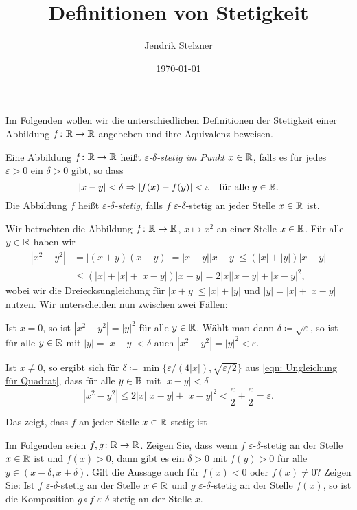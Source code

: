 \documentclass[a4paper,10pt]{article}
\title{Definitionen von Stetigkeit}
\author{Jendrik Stelzner}
\date{\today}
\begin{document}
\maketitle


Im Folgenden wollen wir die unterschiedlichen Definitionen der Stetigkeit einer Abbildung $f \colon \mathbb{R} \to \mathbb{R}$ angebeben und ihre Äquivalenz beweisen.


\begin{defi}
 Eine Abbildung $f \colon \mathbb{R} \to \mathbb{R}$ heißt \emph{$\varepsilon$-$\delta$-stetig im Punkt $x \in \mathbb{R}$}, falls es für jedes $\varepsilon > 0$ ein $\delta > 0$ gibt, so dass
 \[
  |x-y| < \delta \Rightarrow |f(x)-f(y)| < \varepsilon \quad \text{für alle $y \in \mathbb{R}$}.
 \]
 Die Abbildung $f$ heißt \emph{$\varepsilon$-$\delta$-stetig}, falls $f$ $\varepsilon$-$\delta$-stetig an jeder Stelle $x \in \mathbb{R}$ ist.
\end{defi}

\begin{bsp}
 Wir betrachten die Abbildung $f \colon \mathbb{R} \to \mathbb{R}$, $x \mapsto x^2$ an einer Stelle $x \in \mathbb{R}$. Für alle $y \in \mathbb{R}$ haben wir
 \begin{equation}\label{eqn: Ungleichung für Quadrat}
  \begin{aligned}
   \left| x^2 - y^2 \right|
   &= |(x+y)(x-y)|
   = |x+y||x-y|
   \leq (|x|+|y|)|x-y| \\
   &\leq (|x|+|x|+|x-y|)|x-y|
   = 2|x||x-y| + |x-y|^2,
  \end{aligned}
 \end{equation}
 wobei wir die Dreiecksungleichung für \mbox{$|x+y| \leq |x| + |y|$} und \mbox{$|y| = |x| + |x-y|$} nutzen. Wir unterscheiden nun zwischen zwei Fällen:
 
 Ist $x = 0$, so ist $|x^2 - y^2| = |y|^2$ für alle $y \in \mathbb{R}$. Wählt man dann $\delta \coloneqq \sqrt{\varepsilon}$, so ist für alle $y \in \mathbb{R}$ mit $|y| = |x-y| < \delta$ auch $|x^2-y^2| = |y|^2 < \varepsilon$.
 
 Ist $x \neq 0$, so ergibt sich für $\delta \coloneqq \min\{ \varepsilon/(4|x|), \sqrt{\varepsilon/2} \}$ aus \eqref{eqn: Ungleichung für Quadrat}, dass für alle $y \in \mathbb{R}$ mit $|x-y| < \delta$
 \[
  \left| x^2 - y^2 \right| \leq 2|x||x-y| + |x-y|^2 < \frac{\varepsilon}{2} + \frac{\varepsilon}{2} = \varepsilon.
 \]
 
 Das zeigt, dass $f$ an jeder Stelle $x \in \mathbb{R}$ stetig ist
\end{bsp}


\begin{ExerciseList}
 Im Folgenden seien $f, g \colon \mathbb{R} \to \mathbb{R}$.
 \Exercise
  Zeigen Sie, dass wenn $f$ $\varepsilon$-$\delta$-stetig an der Stelle $x \in \mathbb{R}$ ist und $f(x) > 0$, dann gibt es ein $\delta > 0$ mit $f(y) > 0$ für alle $y \in (x-\delta, x+\delta)$. Gilt die Aussage auch für $f(x) < 0$ oder $f(x) \neq 0$?
 \Exercise
  Zeigen Sie: Ist $f$ $\varepsilon$-$\delta$-stetig an der Stelle $x \in \mathbb{R}$ und $g$ $\varepsilon$-$\delta$-stetig an der Stelle $f(x)$, so ist die Komposition $g \circ f$ $\varepsilon$-$\delta$-stetig an der Stelle $x$.
\end{ExerciseList}
\end{document}
